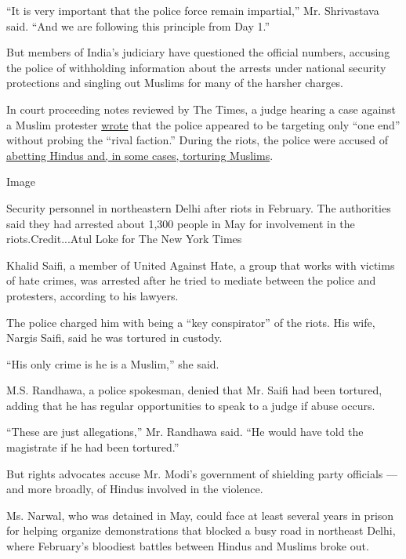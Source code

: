 ``It is very important that the police force remain impartial,'' Mr.
Shrivastava said. ``And we are following this principle from Day 1.''

But members of India's judiciary have questioned the official numbers,
accusing the police of withholding information about the arrests under
national security protections and singling out Muslims for many of the
harsher charges.

In court proceeding notes reviewed by The Times, a judge hearing a case
against a Muslim protester
\href{https://www.outlookindia.com/newsscroll/delhi-violence-investigation-in-case-seems-to-be-targeted-towards-one-end-says-court/1848821}{wrote}
that the police appeared to be targeting only ``one end'' without
probing the ``rival faction.'' During the riots, the police were accused
of
\href{https://www.nytimes3xbfgragh.onion/2020/03/12/world/asia/india-police-muslims.html}{abetting
Hindus and, in some cases, torturing Muslims}.

Image

Security personnel in northeastern Delhi after riots in February. The
authorities said they had arrested about 1,300 people in May for
involvement in the riots.Credit...Atul Loke for The New York Times

Khalid Saifi, a member of United Against Hate, a group that works with
victims of hate crimes, was arrested after he tried to mediate between
the police and protesters, according to his lawyers.

The police charged him with being a ``key conspirator'' of the riots.
His wife, Nargis Saifi, said he was tortured in custody.

``His only crime is he is a Muslim,'' she said.

M.S. Randhawa, a police spokesman, denied that Mr. Saifi had been
tortured, adding that he has regular opportunities to speak to a judge
if abuse occurs.

``These are just allegations,'' Mr. Randhawa said. ``He would have told
the magistrate if he had been tortured.''

But rights advocates accuse Mr. Modi's government of shielding party
officials --- and more broadly, of Hindus involved in the violence.

Ms. Narwal, who was detained in May, could face at least several years
in prison for helping organize demonstrations that blocked a busy road
in northeast Delhi, where February's bloodiest battles between Hindus
and Muslims broke out.


